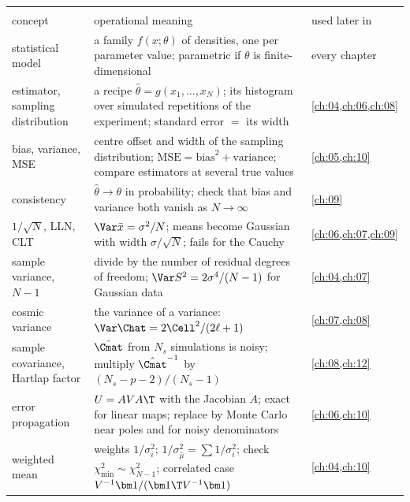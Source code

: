 \begin{center}
\small
\renewcommand{\arraystretch}{1.15}
\begin{tabularx}{\linewidth}{@{}>{\raggedright\arraybackslash}p{3.3cm}
                               >{\raggedright\arraybackslash}X
                               >{\raggedright\arraybackslash}p{2.7cm}@{}}
\toprule
\multicolumn{3}{@{}l}{\textbf{Estimators and their errors (first half)}}\\
concept & operational meaning & used later in\\\midrule
statistical model & a family $f(x;\theta)$ of densities, one per parameter value; parametric if $\theta$ is finite-dimensional & every chapter\\
estimator, sampling distribution & a recipe $\hat\theta=g(x_1,\dots,x_N)$; its histogram over simulated repetitions of the experiment; standard error $=$ its width & \cref{ch:04,ch:06,ch:08}\\
bias, variance, MSE & centre offset and width of the sampling distribution; $\mathrm{MSE}=\mathrm{bias}^2+\mathrm{variance}$; compare estimators at several true values & \cref{ch:05,ch:10}\\
consistency & $\hat\theta\to\theta$ in probability; check that bias and variance both vanish as $N\to\infty$ & \cref{ch:09}\\
$1/\sqrt N$, LLN, CLT & $\Var\bar x=\sigma^2/N$; means become Gaussian with width $\sigma/\sqrt N$; fails for the Cauchy & \cref{ch:06,ch:07,ch:09}\\
sample variance, $N-1$ & divide by the number of residual degrees of freedom; $\Var S^2=2\sigma^4/(N-1)$ for Gaussian data & \cref{ch:04,ch:07}\\
cosmic variance & the variance of a variance: $\Var\Chat=2\Cell^2/(2\ell+1)$ & \cref{ch:07,ch:08}\\
sample covariance, Hartlap factor & $\hat\Cmat$ from $N_s$ simulations is noisy; multiply $\hat\Cmat^{-1}$ by $(N_s-p-2)/(N_s-1)$ & \cref{ch:08,ch:12}\\
error propagation & $U=A V A\T$ with the Jacobian $A$; exact for linear maps; replace by Monte Carlo near poles and for noisy denominators & \cref{ch:06,ch:10}\\
weighted mean & weights $1/\sigma_i^2$; $1/\sigma^2_{\hat\mu}=\sum1/\sigma_i^2$; check $\chi^2_{\min}\sim\chi^2_{N-1}$; correlated case $V^{-1}\bm1/(\bm1\T V^{-1}\bm1)$ & \cref{ch:04,ch:10}\\
\bottomrule
\end{tabularx}
\end{center}

